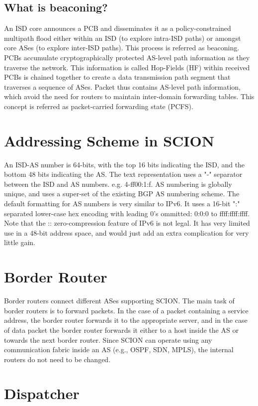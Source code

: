 \subsection{What is beaconing?}
An ISD core announces a PCB and disseminates it as a policy-constrained multipath flood either within an ISD (to explore intra-ISD paths) or amongst core ASes (to explore inter-ISD paths). This process is referred as beaconing. PCBs accumulate cryptographically protected AS-level path information as they traverse the network. This information is called Hop-Fields (HF) within received PCBs is chained together to create a data transmission path segment that traverses a sequence of ASes. Packet thus contains AS-level path information, which avoid the need for routers to maintain inter-domain forwarding tables. This concept is referred as packet-carried forwarding state (PCFS).

\section{Addressing Scheme in SCION}
An ISD-AS number is 64-bits, with the top 16 bits indicating the ISD, and the bottom 48 bits indicating the AS. The text representation uses a "-" separator between the ISD and AS numbers. e.g. 4-ff00:1:f. AS numbering is globally unique, and uses a super-set of the existing BGP AS numbering scheme. The default formatting for AS numbers is very similar to IPv6. It uses a 16-bit ":" separated lower-case hex encoding with leading 0's ommitted: 0:0:0 to ffff:ffff:ffff. Note that the :: zero-compression feature of IPv6 is not legal. It has very limited use in a 48-bit address space, and would just add an extra complication for very little gain.

\section{Border Router}
Border routers connect different ASes supporting SCION. The main task of border routers is to forward packets. In the case of a packet containing a service address, the border router forwards it to the appropriate server, and in the case of data packet the border router forwards it either to a host inside the AS or towards the next border router. Since SCION can operate using any communication fabric inside an AS (e.g., OSPF, SDN, MPLS), the internal routers do not need to be changed.

\section{Dispatcher}


